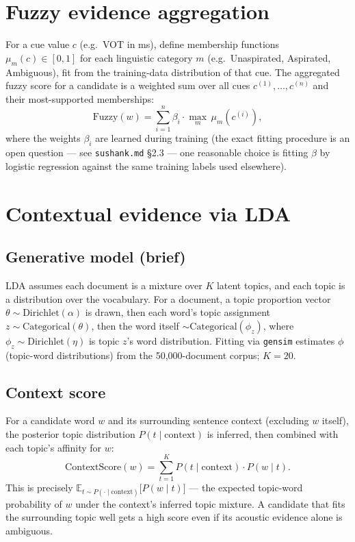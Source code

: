 \documentclass[11pt]{article}
\begin{document}
\section{Fuzzy evidence aggregation}

For a cue value $c$ (e.g.\ VOT in ms), define membership functions
$\mu_m(c) \in [0,1]$ for each linguistic category $m$ (e.g.\ Unaspirated,
Aspirated, Ambiguous), fit from the training-data distribution of that
cue. The aggregated fuzzy score for a candidate is a weighted sum over
all cues $c^{(1)}, \ldots, c^{(n)}$ and their most-supported memberships:
\begin{equation}
\text{Fuzzy}(w) = \sum_{i=1}^{n} \beta_i \cdot \max_m \, \mu_m\!\left(c^{(i)}\right),
\end{equation}
where the weights $\beta_i$ are learned during training (the exact
fitting procedure is an open question --- see \texttt{sushank.md} \S2.3
--- one reasonable choice is fitting $\beta$ by logistic regression
against the same training labels used elsewhere).

\section{Contextual evidence via LDA}

\subsection{Generative model (brief)}
LDA assumes each document is a mixture over $K$ latent topics, and each
topic is a distribution over the vocabulary. For a document, a topic
proportion vector $\theta \sim \text{Dirichlet}(\alpha)$ is drawn, then
each word's topic assignment $z \sim \text{Categorical}(\theta)$, then
the word itself $\sim \text{Categorical}(\phi_z)$, where $\phi_z \sim
\text{Dirichlet}(\eta)$ is topic $z$'s word distribution. Fitting via
\texttt{gensim} estimates $\phi$ (topic-word distributions) from the
50{,}000-document corpus; $K=20$.

\subsection{Context score}
For a candidate word $w$ and its surrounding sentence context (excluding
$w$ itself), the posterior topic distribution $P(t \mid \text{context})$
is inferred, then combined with each topic's affinity for $w$:
\begin{equation}
\text{ContextScore}(w) = \sum_{t=1}^{K} P(t \mid \text{context}) \cdot P(w \mid t).
\label{eq:context}
\end{equation}
This is precisely $\mathbb{E}_{t \sim P(\cdot \mid \text{context})}\big[P(w \mid t)\big]$
--- the expected topic-word probability of $w$ under the context's
inferred topic mixture. A candidate that fits the surrounding topic well
gets a high score even if its acoustic evidence alone is ambiguous.
\end{document}
